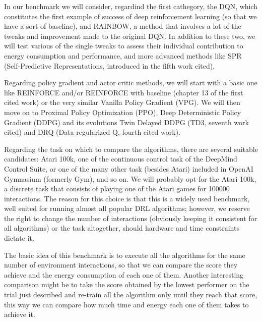 \documentclass[a0paper,portrait]{baposter}
\begin{document}
\begin{poster}
{In our benchmark we will consider, regardind the first cathegory, the DQN, which constitutes the first example of success of deep reinforcement learning (so that we have a sort of baseline), and RAINBOW, a method that involves a lot of the tweaks and improvement made to the original DQN. In addition to these two, we will test various of the single tweaks to assess their individual contribution to energy consumption and performance, and more advanced methods like SPR (Self-Predictive Representations, introduced in the fifth work cited).

Regarding policy gradient and actor critic methods, we will start with a basic one like REINFORCE and/or REINFORCE with baseline (chapter 13 of the first cited work) or the very similar Vanilla Policy Gradient (VPG). We will then move on to Proximal Policy Optimization (PPO), Deep Deterministic Policy Gradient (DDPG)  and its evolutions Twin Delayed DDPG (TD3, seventh work cited) and DRQ (Data-regularized Q, fourth cited work).

Regarding the task on which to compare the algorithms, there are several suitable candidates: Atari 100k, one of the continuous control task of the DeepMind Control Suite, or one of the many other task (besides Atari) included in OpenAI Gymnasium (formerly Gym), and so on. We will probably opt for the Atari 100k, a discrete task that consists of playing one of the Atari games for 100000 interactions. 
The reason for this choice is that this is a widely used benchmark, well suited for running almost all popular DRL algorithms; however, we reserve the right to change the number of interactions (obviously keeping it consistent for all algorithms) or the task altogether, should hardware and time constraints dictate it.

The basic idea of this benchmark is to execute all the algorithms for the same number of environment interactions, so that we can compare the score they achieve and the energy consumption of each one of them. Another interesting comparison might be to take the score obtained by the lowest performer on the trial just described and re-train all the algorithm only until they reach that score, this way we can compare how much time and energy each one of them takes to achieve it.

}

%
%
%
%


\end{poster}
\end{document}
